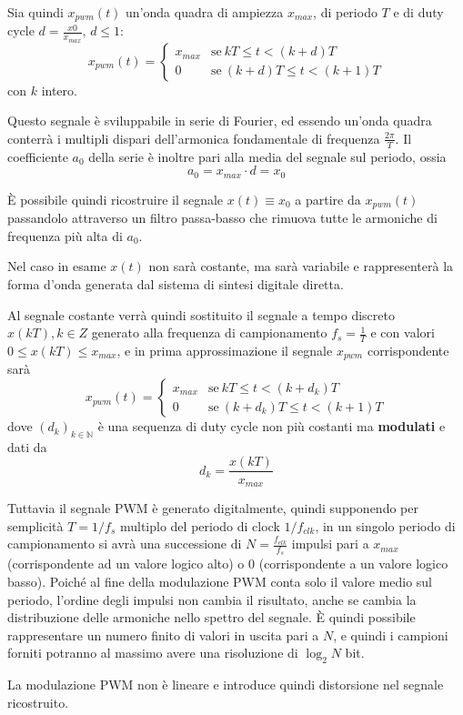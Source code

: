 Sia quindi $x_{pwm}(t)$ un'onda quadra di ampiezza $x_{max}$, di periodo $T$ e di duty cycle $d=\frac{x0}{x_{max}}$, $d \le 1$:
\[
x_{pwm}(t) = \begin{cases}
	x_{max} & \text{se}\ kT \le t < (k+d)T \\
	0 & \text{se}\ (k+d)T \le t < (k+1)T
\end{cases}
\] 
con $k$ intero.

Questo segnale è sviluppabile in serie di Fourier, ed essendo un'onda quadra
conterrà i multipli dispari dell'armonica fondamentale di frequenza $\frac{2\pi}{T}$.
Il coefficiente $a_0$ della serie è inoltre pari alla media del segnale sul periodo, ossia
\[
a_0 = x_{max} \cdot d = x_0
\]

È possibile quindi ricostruire il segnale $x(t)\equiv x_0$ a partire da $x_{pwm}(t)$ passandolo attraverso un filtro passa-basso che rimuova tutte le armoniche di frequenza
più alta di $a_0$.

Nel caso in esame $x(t)$ non sarà costante, ma sarà variabile e rappresenterà la forma d'onda generata dal sistema di sintesi digitale diretta.

Al segnale costante verrà quindi sostituito il segnale a tempo discreto $x(kT), k \in Z$ generato alla frequenza di campionamento $f_s = \frac{1}{T}$ e con valori $0 \leq x(kT) \leq x_{max}$, e in prima approssimazione il segnale $x_{pwm}$ corrispondente sarà
\[
x_{pwm}(t) = \begin{cases}
	x_{max} & \text{se}\ kT \le t < (k + d_k)T \\
	0 & \text{se}\ (k+d_k)T \le t < (k+1)T
\end{cases}
\]
dove $(d_k)_{k \in \mathbb{N}}$ è una sequenza di duty cycle non più costanti ma \textbf{modulati} e dati da
\[
d_k = \frac{x(kT)}{x_{max}}
\]

Tuttavia il segnale PWM è generato digitalmente, quindi supponendo per semplicità $T=1/f_s$ multiplo del periodo di clock $1/f_{clk}$, in un singolo periodo
di campionamento si avrà una successione di $N=\frac{f_{clk}}{f_s}$ impulsi pari a $x_{max}$ (corrispondente ad un valore logico alto) o $0$ (corrispondente a un valore logico basso).
Poiché al fine della modulazione PWM conta solo il valore medio sul periodo, l'ordine degli impulsi non cambia il risultato, anche se cambia la distribuzione delle armoniche nello spettro del segnale.
È quindi possibile rappresentare un numero finito di valori in uscita pari a $N$, e quindi i campioni forniti potranno al massimo avere una risoluzione di $\log_2{N}$ bit.

La modulazione PWM non è lineare e introduce quindi distorsione nel segnale ricostruito.

